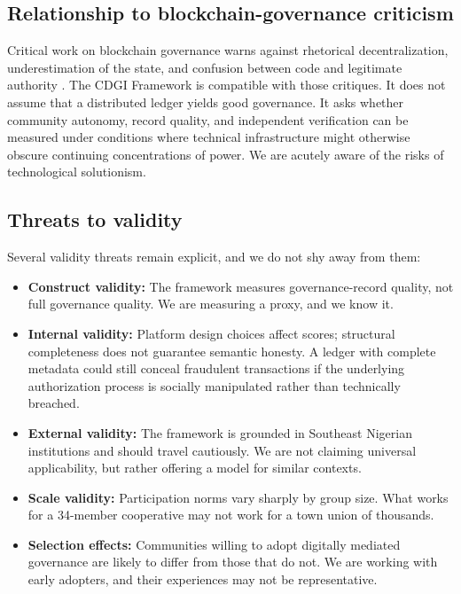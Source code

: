 \documentclass[sigconf,anonymous]{acmart}
\begin{document}
\subsection{Relationship to blockchain-governance criticism}

Critical work on blockchain governance warns against rhetorical decentralization, underestimation of the state, and confusion between code and legitimate authority \cite{atzori2017, schneider2019}. The CDGI Framework is compatible with those critiques. It does not assume that a distributed ledger yields good governance. It asks whether community autonomy, record quality, and independent verification can be measured under conditions where technical infrastructure might otherwise obscure continuing concentrations of power. We are acutely aware of the risks of technological solutionism.

\subsection{Threats to validity}

Several validity threats remain explicit, and we do not shy away from them:

\begin{itemize}
\item \textbf{Construct validity:} The framework measures governance-record quality, not full governance quality. We are measuring a proxy, and we know it.
\item \textbf{Internal validity:} Platform design choices affect scores; structural completeness does not guarantee semantic honesty. A ledger with complete metadata could still conceal fraudulent transactions if the underlying authorization process is socially manipulated rather than technically breached.
\item \textbf{External validity:} The framework is grounded in Southeast Nigerian institutions and should travel cautiously. We are not claiming universal applicability, but rather offering a model for similar contexts.
\item \textbf{Scale validity:} Participation norms vary sharply by group size. What works for a 34-member cooperative may not work for a town union of thousands.
\item \textbf{Selection effects:} Communities willing to adopt digitally mediated governance are likely to differ from those that do not. We are working with early adopters, and their experiences may not be representative.
\end{itemize}
\end{document}
